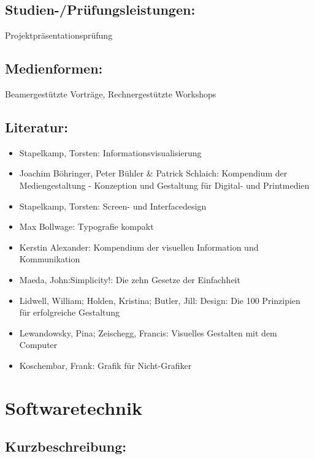 \section{Studien-/Prüfungsleistungen:}\label{studien-pruxfcfungsleistungen-25}

Projektpräsentationsprüfung

\section{Medienformen:}\label{medienformen-25}

Beamergestützte Vorträge, Rechnergestützte Workshops

\section{Literatur:}\label{literatur-25}

\begin{itemize}
\tightlist
\item
  Stapelkamp, Torsten: Informationsvisualisierung
\item
  Joachim Böhringer, Peter Bühler \& Patrick Schlaich: Kompendium der
  Mediengestaltung - Konzeption und Gestaltung für Digital- und
  Printmedien
\item
  Stapelkamp, Torsten: Screen- und Interfacedesign
\item
  Max Bollwage: Typografie kompakt
\item
  Kerstin Alexander: Kompendium der visuellen Information und
  Kommunikation
\item
  Maeda, John:Simplicity!: Die zehn Gesetze der Einfachheit
\item
  Lidwell, William; Holden, Kristina; Butler, Jill: Design: Die 100
  Prinzipien für erfolgreiche Gestaltung
\item
  Lewandowsky, Pina; Zeischegg, Francis: Visuelles Gestalten mit dem
  Computer
\item
  Koschembar, Frank: Grafik für Nicht-Grafiker
\end{itemize}

\chapter{Softwaretechnik}\label{softwaretechnik}

\section{Kurzbeschreibung:}\label{kurzbeschreibung-4}

